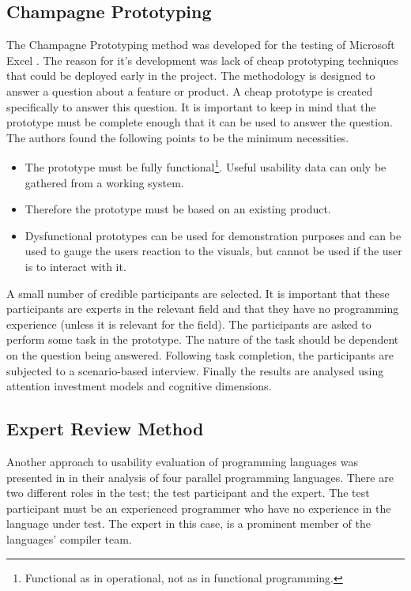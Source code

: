 \subsection{Champagne Prototyping} \label{sec:champagne}
The Champagne Prototyping method was developed for the testing of Microsoft Excel \cite{blackwell2004champagne}. The reason for it's development was lack of cheap prototyping techniques that could be deployed early in the project. The methodology is designed to answer a question about a feature or product. A cheap prototype is created specifically to answer this question. It is important to keep in mind that the prototype must be complete enough that it can be used to answer the question. The authors found the following points to be the minimum necessities.
\begin{itemize}
    \item The prototype must be fully functional\footnote{Functional as in operational, not as in functional programming.}. Useful usability data can only be gathered from a working system.
    \item Therefore the prototype must be based on an existing product.
    \item Dysfunctional prototypes can be used for demonstration purposes and can be used to gauge the users reaction to the visuals, but cannot be used if the user is to interact with it.
\end{itemize}
A small number of credible participants are selected. It is important that these participants are experts in the relevant field and that they have no programming experience (unless it is relevant for the field). The participants are asked to perform some task in the prototype. The nature of the task should be dependent on the question being answered. Following task completion, the participants are subjected to a scenario-based interview. Finally the results are analysed using attention investment models and cognitive dimensions.

\subsection{Expert Review Method} \label{sec:expert-review}
Another approach to usability evaluation of programming languages was presented in \cite{nanz2013examining} in their analysis of four parallel programming languages. There are two different roles in the test; the test participant and the expert. The test participant must be an experienced programmer who have no experience in the language under test. The expert in this case, is a prominent member of the languages' compiler team.

